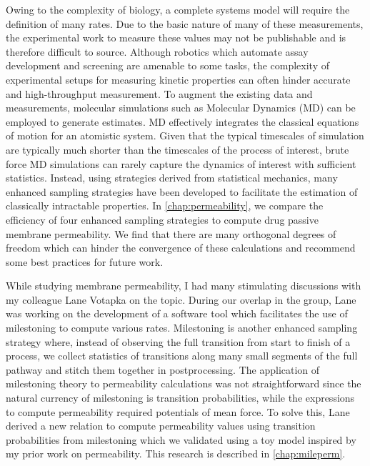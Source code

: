 \par Owing to the complexity of biology, a complete systems model will require the definition of many rates.
Due to the basic nature of many of these measurements, the experimental work to measure these values may not be publishable and is therefore difficult to source.
Although robotics which automate assay development and screening are amenable to some tasks, the complexity of experimental setups for measuring kinetic properties can often hinder accurate and high-throughput measurement.
To augment the existing data and measurements, molecular simulations such as Molecular Dynamics (MD) can be employed to generate estimates\cite{Leach2001,Durrant2011a}.
MD effectively integrates the classical equations of motion for an atomistic system.
Given that the typical timescales of simulation are typically much shorter than the timescales of the process of interest, brute force MD simulations can rarely capture the dynamics of interest with sufficient statistics.
Instead, using strategies derived from statistical mechanics, many enhanced sampling strategies have been developed to facilitate the estimation of classically intractable properties\cite{Chipot2007,Tuckerman2010}.
In \cref{chap:permeability}, we compare the efficiency of four enhanced sampling strategies to compute drug passive membrane permeability.
We find that there are many orthogonal degrees of freedom which can hinder the convergence of these calculations and recommend some best practices for future work.

\par While studying membrane permeability, I had many stimulating discussions with my colleague Lane Votapka on the topic.
During our overlap in the group, Lane was working on the development of a software tool which facilitates the use of milestoning to compute various rates.
Milestoning is another enhanced sampling strategy where, instead of observing the full transition from start to finish of a process, we collect statistics of transitions along many small segments of the full pathway and stitch them together in postprocessing\cite{Faradjian2004,Majek2010,Vanden-Eijnden2008,Kirmizialtin2011,Votapka2015,Bello-Rivas2015,Votapka2017c}.
The application of milestoning theory to permeability calculations was not straightforward since the natural currency of milestoning is transition probabilities, while the expressions to compute permeability required potentials of mean force.
To solve this, Lane derived a new relation to compute permeability values using transition probabilities from milestoning which we validated using a toy model inspired by my prior work on permeability.
This research is described in \cref{chap:mileperm}.


